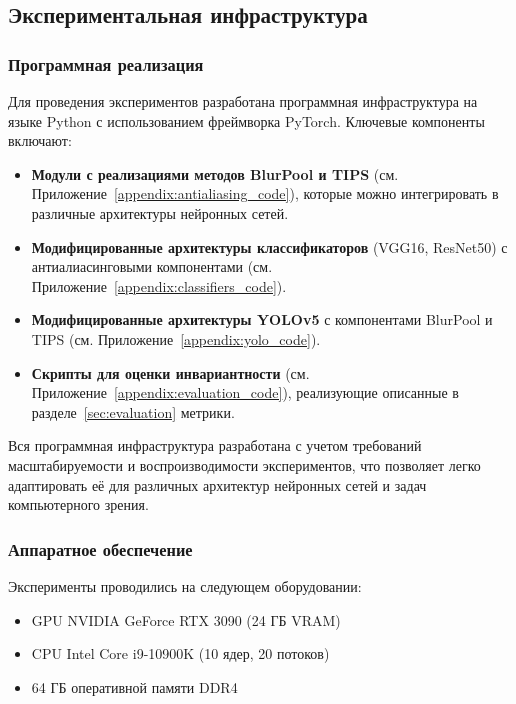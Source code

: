 \subsection{Экспериментальная инфраструктура}
\label{sec:infrastructure}

\subsubsection{Программная реализация}
\label{sec:implementation}

Для проведения экспериментов разработана программная инфраструктура на языке Python с использованием фреймворка PyTorch. Ключевые компоненты включают:

\begin{itemize}
    \item \textbf{Модули с реализациями методов BlurPool и TIPS} (см. Приложение~\ref{appendix:antialiasing_code}), которые можно интегрировать в различные архитектуры нейронных сетей.
    
    \item \textbf{Модифицированные архитектуры классификаторов} (VGG16, ResNet50) с антиалиасинговыми компонентами (см. Приложение~\ref{appendix:classifiers_code}).
    
    \item \textbf{Модифицированные архитектуры YOLOv5} с компонентами BlurPool и TIPS (см. Приложение~\ref{appendix:yolo_code}).
    
    \item \textbf{Скрипты для оценки инвариантности} (см. Приложение~\ref{appendix:evaluation_code}), реализующие описанные в разделе~\ref{sec:evaluation} метрики.
\end{itemize}

Вся программная инфраструктура разработана с учетом требований масштабируемости и воспроизводимости экспериментов, что позволяет легко адаптировать её для различных архитектур нейронных сетей и задач компьютерного зрения.

\subsubsection{Аппаратное обеспечение}
\label{sec:hardware}

Эксперименты проводились на следующем оборудовании:
\begin{itemize}
    \item GPU NVIDIA GeForce RTX 3090 (24 ГБ VRAM)
    \item CPU Intel Core i9-10900K (10 ядер, 20 потоков)
    \item 64 ГБ оперативной памяти DDR4
\end{itemize}

